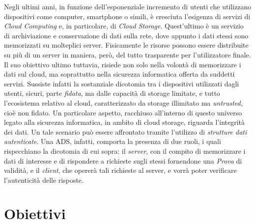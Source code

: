 
	Negli ultimi anni, in funzione dell'esponenziale incremento di utenti che utilizzano dispositivi come computer, smartphone o simili, è cresciuta l'esigenza di servizi di \textit{Cloud Computing} e, in particolare, di \textit{Cloud Storage}. Quest'ultimo è un servizio di archiviazione e conservazione di dati sulla rete, dove appunto i dati stessi sono memorizzati su molteplici server. Fisicamente le risorse possono essere distribuite su più di un server in maniera, però, del tutto trasparente per l'utilizzatore finale. Il suo obiettivo ultimo tuttavia, risiede non solo nella volontà di memorizzare i dati sul cloud, ma soprattutto nella sicurezza informatica offerta da suddetti servizi.
	Sussiste infatti la sostanziale dicotomia tra i dispositivi utilizzati dagli utenti, sicuri, parte \textit{fidata}, ma dalle capacità di storage limitate, e tutto l'ecosistema relativo al cloud, caratterizzato da storage illimitato ma \textit{untrusted}, cioè non fidato.
	Un particolare aspetto, racchiuso all'interno di questo universo legato alla sicurezza informatica, in ambito di cloud storage, riguarda l'integrità dei dati. Un tale scenario può essere affrontato tramite l'utilizzo di \textit{strutture dati autenticate}. Una ADS, infatti, comporta la presenza di due ruoli, i quali rispecchiano la dicotomia di cui sopra: il \textit{server}, con il compito di memorizzare i dati di interesse e di rispondere a richieste sugli stessi fornendone una \textit{Prova} di validità, e il \textit{client}, che opererà tali richieste al server, e vorrà poter verificare l'autenticità delle risposte.
	
	
\section{Obiettivi}


